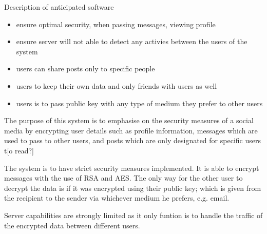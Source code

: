 Description of anticipated software

\begin{itemize}
\item ensure optimal security, when passing messages, viewing profile
\item ensure server will not able to detect any activies between the users of
      the system
\item users can share posts only to specific people
\item users to keep their own data and only friends with users as well
\item users is to pass public key with any type of medium they prefer to other
      users
\end{itemize}

The purpose of this system is to emphasise on the security measures of a social
media by encrypting user details such as profile information, messages which are
used to pass to other users, and posts which are only designated for specific
users t[o read?]

The system is to have strict security measures implemented. It is able to
encrypt messages with the use of RSA and AES. The only way for the other user to
decrypt the data is if it was encrypted using their public key; which is given
from the recipient to the sender via whichever medium he prefers, e.g. email.

Server capabilities are strongly limited as it only funtion is to handle the
traffic of the encrypted data between different users. 

